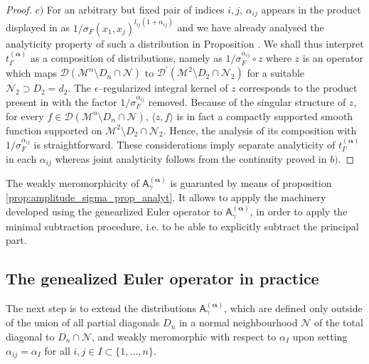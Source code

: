 \documentclass[11pt]{book}
\newcommand{\alphabd}{\boldsymbol{\alpha}}
\newcommand{\Dcal}{\mathcal{D}}
\newcommand{\Mcal}{\mathcal{M}}
\newcommand{\Ncal}{\mathcal{N}}
\newcommand{\Asf}{\mathsf{A}}
\theoremstyle{break}
\begin{document}
\begin{proof}
\bigskip


$c)$ 
For an arbitrary but fixed pair of indices $i,j$, $\alpha_{ij}$ appears in the product displayed in %
as $1/\sigma_F(x_1,x_j)^{l_{ij}(1+\alpha_{ij})}$ and we have already analysed the analyticity property of such a distribution in Proposition %
. 
We shall thus interpret $t_\Gamma^{(\alphabd)}$ as a composition of distributions, namely as $1/\sigma_F^{\alpha_{ij}}\circ z $
 where $z$ is an operator which maps $\Dcal(\Mcal^{n}\setminus D_{n}\cap \Ncal)$ to $ \Dcal^\prime(\Mcal^{2}\setminus D_2\cap \Ncal_2)$ for a suitable $\Ncal_2\supset D_2=d_2$. The $\epsilon$--regularized integral kernel of $z$ corresponds to the product present in %
 with the factor  $1/\sigma_F^{\alpha_{ij}}$ removed. Because of the singular structure of $z$, for every $f\in \Dcal(\Mcal^{n}\setminus D_{n}\cap \Ncal)$, $\langle z,f\rangle$ is in fact a compactly supported smooth function supported on $\Mcal^{2}\setminus D_2\cap \Ncal_2$. Hence, the analysis of its composition with $1/\sigma_F^{\alpha_{ij}}$ is straightforward. These considerations imply separate analyticity of $t_\Gamma^{(\alphabd)}$ in each $\alpha_{ij}$ whereas joint analyticity follows from the continuity proved in $b)$.
\end{proof}


The weakly meromorphicity of $\Asf_\gamma^{(\alphabd)}$ is guaranted by means of proposition \ref{prop:amplitude_sigma_prop_analyt}. It allows to appply the machinery developed using the genearlized Euler operator to $\Asf_\gamma^{(\alphabd)}$, in order to apply the minimal subtraction procedure, i.e. to be able to explicitly subtract the principal part.


\subsection{The genealized Euler operator in practice}
\label{p:EULER_OP_PRACTICE}


The next step is to extend the distributions $\Asf^{(\alphabd)}_\gamma$, which are defined only outside of the union of all partial diagonals $D_n$ in a normal neighbourhood $\Ncal$ of the total diagonal to $D_n \cap \Ncal$, and weakly meromorphic with respect to $\alpha_I$ upon setting $\alpha_{ij}=\alpha_I$ for all $i,j\in I\subset \{1,\ldots,n\}$. 
\end{document}
